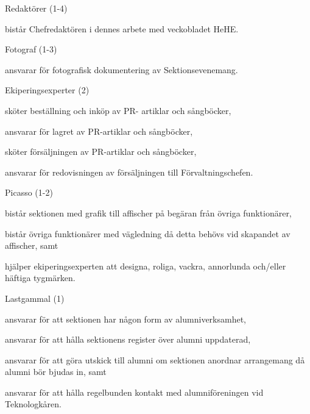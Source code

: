 \documentclass[10pt]{article}
\begin{document}
\begin{emptylist}
    	\item Redaktörer (1-4)
    		\begin{dashlist}
    			\item bistår Chefredaktören i dennes arbete med veckobladet HeHE.
    		\end{dashlist}
    \item Fotograf (1-3)
        \begin{dashlist}
            \item ansvarar för fotografisk dokumentering av Sektionsevenemang.
        \end{dashlist}
    \item Ekiperingsexperter (2)
        \begin{dashlist}
            \item sköter beställning och inköp av PR- artiklar och sångböcker,
            \item ansvarar för lagret av PR-artiklar och sångböcker,
            \item sköter försäljningen av PR-artiklar och sångböcker,
            \item ansvarar för redovisningen av försäljningen till Förvaltningschefen.
        \end{dashlist}
    \item Picasso (1-2)
    		\begin{dashlist}
            \item bistår sektionen med grafik till affischer på begäran från övriga funktionärer,
            \item bistår övriga funktionärer med vägledning då detta behövs vid skapandet av affischer, samt
            \item hjälper ekiperingsexperten att designa, roliga, vackra, annorlunda och/eller häftiga tygmärken.
        \end{dashlist}
    \item Lastgammal (1)
    		\begin{dashlist}
            \item ansvarar för att sektionen har någon form av alumniverksamhet,
            \item ansvarar för att hålla sektionens register över alumni uppdaterad,
            \item ansvarar för att göra utskick till alumni om sektionen anordnar arrangemang då alumni bör bjudas in, samt
            \item ansvarar för att hålla regelbunden kontakt med alumniföreningen vid Teknologkåren.
        \end{dashlist}
\end{emptylist}
\end{document}
